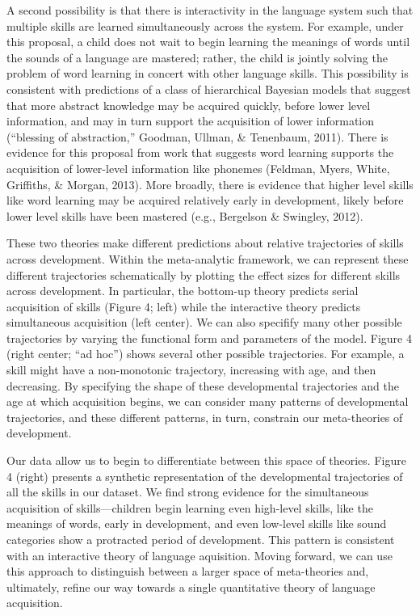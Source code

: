 \documentclass[english,floatsintext,man]{apa6}
\begin{document}
A second possibility is that there is interactivity in the language
system such that multiple skills are learned simultaneously across the
system. For example, under this proposal, a child does not wait to begin
learning the meanings of words until the sounds of a language are
mastered; rather, the child is jointly solving the problem of word
learning in concert with other language skills. This possibility is
consistent with predictions of a class of hierarchical Bayesian models
that suggest that more abstract knowledge may be acquired quickly,
before lower level information, and may in turn support the acquisition
of lower information (``blessing of abstraction,'' Goodman, Ullman, \&
Tenenbaum, 2011). There is evidence for this proposal from work that
suggests word learning supports the acquisition of lower-level
information like phonemes (Feldman, Myers, White, Griffiths, \& Morgan,
2013). More broadly, there is evidence that higher level skills like
word learning may be acquired relatively early in development, likely
before lower level skills have been mastered (e.g., Bergelson \&
Swingley, 2012).

These two theories make different predictions about relative
trajectories of skills across development. Within the meta-analytic
framework, we can represent these different trajectories schematically
by plotting the effect sizes for different skills across development. In
particular, the bottom-up theory predicts serial acquisition of skills
(Figure 4; left) while the interactive theory predicts simultaneous
acquisition (left center). We can also specifify many other possible
trajectories by varying the functional form and parameters of the model.
Figure 4 (right center; \enquote{ad hoc}) shows several other possible
trajectories. For example, a skill might have a non-monotonic
trajectory, increasing with age, and then decreasing. By specifying the
shape of these developmental trajectories and the age at which
acquisition begins, we can consider many patterns of developmental
trajectories, and these different patterns, in turn, constrain our
meta-theories of development.

Our data allow us to begin to differentiate between this space of
theories. Figure 4 (right) presents a synthetic representation of the
developmental trajectories of all the skills in our dataset. We find
strong evidence for the simultaneous acquisition of skills---children
begin learning even high-level skills, like the meanings of words, early
in development, and even low-level skills like sound categories show a
protracted period of development. This pattern is consistent with an
interactive theory of language aquisition. Moving forward, we can use
this approach to distinguish between a larger space of meta-theories
and, ultimately, refine our way towards a single quantitative theory of
language acquisition.
\end{document}
